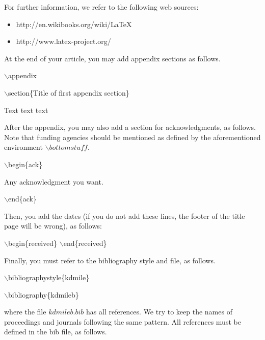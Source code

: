 \documentclass[kdmile,a4paper]{kdmile} %
\newenvironment{latexcode}
{\ttfamily\vspace{0.1in}\setlength{\parindent}{18pt}}
{\vspace{0.1in}}
\begin{document}
	For further information, we refer to the following web sources:
	
	\ttfamily
\begin{itemize}
	\item http://en.wikibooks.org/wiki/LaTeX
	\item http://www.latex-project.org/
\end{itemize}
	
	\rmfamily


At the end of your article, you may add appendix sections as follows.

\begin{latexcode}
	$\backslash$appendix
	
	$\backslash$section\{Title of first appendix section\}

	Text text text
\end{latexcode}

After the appendix, you may also add a section for acknowledgments, as follows. Note that funding agencies should be mentioned as defined by the aforementioned environment $\backslash bottomstuff$.

\begin{latexcode}
				$\backslash$begin\{ack\}
				
				Any acknowledgment you want.
				
				$\backslash$end\{ack\}
\end{latexcode}

Then, you add the dates (if you do not add these lines, the footer of the title page will be wrong), as follows:

\begin{latexcode}
	$\backslash$begin\{received\}
	$\backslash$end\{received\}
\end{latexcode}

Finally, you must refer to the bibliography style and file, as follows.

	\begin{latexcode}
		$\backslash$bibliographystyle\{kdmile\}

		$\backslash$bibliography\{kdmileb\}
	\end{latexcode}

\noindent where the file $kdmileb.bib$ has all references. We try to keep the names of proceedings and journals following the same pattern. All references must be defined in the bib file, as follows. 
\end{document}
